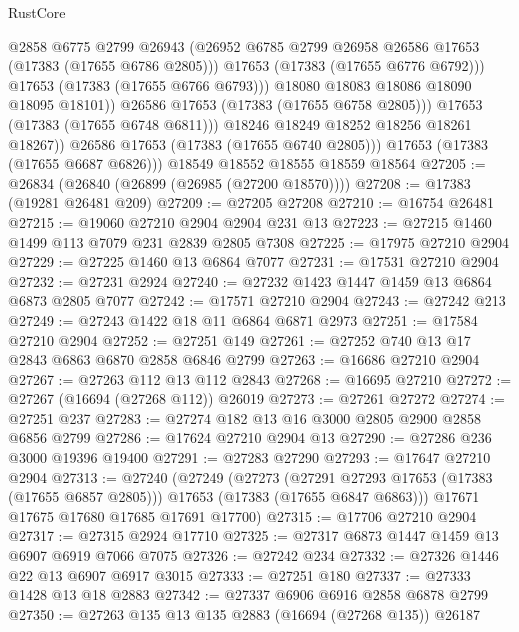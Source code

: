 \begin{lexlean}{RustCore}
\begin{coremodule}
                        @2858
                        @6775
                        @2799
                        @26943
                        (@26952 @6785 @2799 @26958 @26586 @17653 (@17383 (@17655 @6786 @2805)))
                        @17653
                        (@17383 (@17655 @6776 @6792)))
                      @17653
                      (@17383 (@17655 @6766 @6793)))
                    @18080
                    @18083
                    @18086
                    @18090
                    @18095
                    @18101))
                @26586
                @17653
                (@17383 (@17655 @6758 @2805)))
              @17653
              (@17383 (@17655 @6748 @6811)))
            @18246
            @18249
            @18252
            @18256
            @18261
            @18267))
        @26586
        @17653
        (@17383 (@17655 @6740 @2805)))
      @17653
      (@17383 (@17655 @6687 @6826)))
    @18549
    @18552
    @18555
    @18559
    @18564
@27205 := @26834 (@26840 (@26899 (@26985 (@27200 @18570))))
@27208 := @17383 (@19281 @26481 @209)
@27209 := @27205 @27208
@27210 := @16754 @26481
@27215 := @19060 @27210 @2904 @2904 @231 @13
@27223 := @27215 @1460 @1499 @113 @7079 @231 @2839 @2805 @7308
@27225 := @17975 @27210 @2904
@27229 := @27225 @1460 @13 @6864 @7077
@27231 := @17531 @27210 @2904
@27232 := @27231 @2924
@27240 := @27232 @1423 @1447 @1459 @13 @6864 @6873 @2805 @7077
@27242 := @17571 @27210 @2904
@27243 := @27242 @213
@27249 := @27243 @1422 @18 @11 @6864 @6871 @2973
@27251 := @17584 @27210 @2904
@27252 := @27251 @149
@27261 := @27252 @740 @13 @17 @2843 @6863 @6870 @2858 @6846 @2799
@27263 := @16686 @27210 @2904
@27267 := @27263 @112 @13 @112 @2843
@27268 := @16695 @27210
@27272 := @27267 (@16694 (@27268 @112)) @26019
@27273 := @27261 @27272
@27274 := @27251 @237
@27283 := @27274 @182 @13 @16 @3000 @2805 @2900 @2858 @6856 @2799
@27286 := @17624 @27210 @2904 @13
@27290 := @27286 @236 @3000 @19396 @19400
@27291 := @27283 @27290
@27293 := @17647 @27210 @2904
@27313 := @27240
    (@27249
      (@27273
        (@27291 @27293 @17653 (@17383 (@17655 @6857 @2805)))
        @17653
        (@17383 (@17655 @6847 @6863)))
      @17671
      @17675
      @17680
      @17685
      @17691
      @17700)
@27315 := @17706 @27210 @2904
@27317 := @27315 @2924 @17710
@27325 := @27317 @6873 @1447 @1459 @13 @6907 @6919 @7066 @7075
@27326 := @27242 @234
@27332 := @27326 @1446 @22 @13 @6907 @6917 @3015
@27333 := @27251 @180
@27337 := @27333 @1428 @13 @18 @2883
@27342 := @27337 @6906 @6916 @2858 @6878 @2799
@27350 := @27263 @135 @13 @135 @2883 (@16694 (@27268 @135)) @26187

\end{coremodule}
\end{lexlean}
